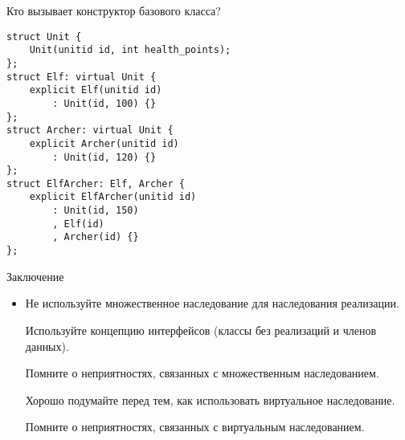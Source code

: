 \documentclass{beamer}
\begin{document}
\begin{frame}[fragile]{Кто вызывает конструктор базового класса?}
\begin{minipage}{.6\textwidth}
    \begin{lstlisting}
struct Unit { 
    Unit(unitid id, int health_points); 
};
struct Elf: virtual Unit {
    explicit Elf(unitid id) 
        : Unit(id, 100) {}
};
struct Archer: virtual Unit {
    explicit Archer(unitid id) 
        : Unit(id, 120) {}
};
struct ElfArcher: Elf, Archer {
    explicit ElfArcher(unitid id) 
        : Unit(id, 150)
        , Elf(id)
        , Archer(id) {}
};
    \end{lstlisting}
\end{minipage}\hspace{10mm}
\begin{minipage}{.25\textwidth}
\end{minipage}

\end{frame}

\begin{frame}[fragile]{Заключение}
    \begin{itemize}
        \item Не используйте множественное наследование для наследования
            реализации.
        
        \pitem Используйте концепцию интерфейсов (классы без реализаций и членов данных).

        \pitem Помните о неприятностях, связанных с множественным наследованием.

        \pitem Хорошо подумайте перед тем, как использовать виртуальное
            наследование.

        \pitem Помните о неприятностях, связанных с виртуальным наследованием.
    \end{itemize}
\end{frame}
\end{document}
